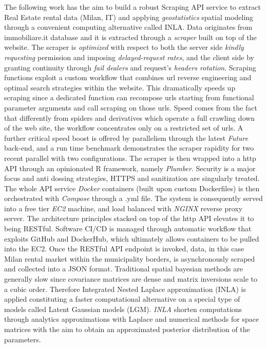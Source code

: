 \documentclass[
  12pt,
  a4paper,
  oneside]{book}
\theoremstyle{definition}
\theoremstyle{definition}
\theoremstyle{definition}
\theoremstyle{remark}
\begin{document}
The following work has the aim to build a robust Scraping API service to extract Real Estate rental data (Milan, IT) and applying \emph{geostatistics} spatial modeling through a convenient computing alternative called INLA.
Data originates from immobiliare.it database and it is extracted through a \emph{scraper} built on top of the website. The scraper is \emph{optimized} with respect to both the server side \emph{kindly requesting} permission and imposing \emph{delayed-request rates}, and the client side by granting continuity through \emph{fail dealers} and request's \emph{headers rotation}. Scraping functions exploit a custom workflow that combines url reverse engineering and optimal search strategies within the website. This dramatically speeds up scraping since a dedicated function can recompose urls starting from functional parameter arguments and call scraping on those urls. Speed comes from the fact that differently from spiders and derivatives which operate a full crawling down of the web site, the workflow concentrates only on a restricted set of urls. A further critical speed boost is offered by parallelism through the latest \emph{Future} back-end, and a run time benchmark demonstrates the scraper rapidity for two recent parallel with two configurations.
The scraper is then wrapped into a http API through an opinionated R framework, namely \emph{Plumber}. Security is a major focus and anti dossing strategies, HTTPS and sanitization are singularly treated. The whole API service \emph{Docker} containers (built upon custom Dockerfiles) is then orchestrated with \emph{Compose} through a .yml file. The system is consequently served into a free tier \emph{EC2} machine, and load balanced with \emph{NGINX} reverse proxy server. The architecture principles stacked on top of the http API elevates it to being RESTful. Software CI/CD is managed through automatic workflow that exploits GitHub and DockerHub, which ultimately allows containers to be pulled into the EC2. Once the RESTful API endpoint is invoked, data, in this case Milan rental market within the municipality borders, is asynchronously scraped and collected into a JSON format.
Traditional spatial bayesian methods are generally slow since covariance matrices are dense and matrix inversions scale to a cubic order. Therefore Integrated Nested Laplace approximation (INLA) is applied constituting a faster computational alternative on a special type of models called Latent Gaussian models (LGM). \emph{INLA} shorten computations through analytics approximations with Laplace and numerical methods for space matrices with the aim to obtain an approximated posterior distribution of the parameters.
\end{document}
